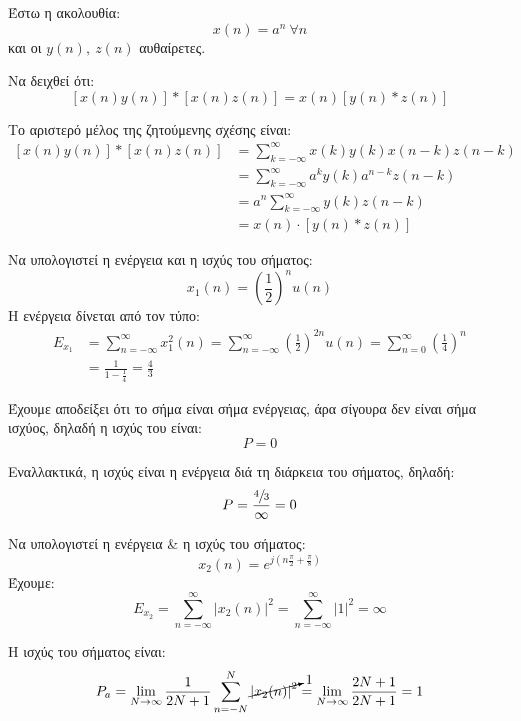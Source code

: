 \documentclass[11pt,a4paper,notitlepage,fleqn]{article}
\begin{document}
\begin{exercise}
	Έστω η ακολουθία:
	\[
	x(n) = a^n\ \forall n
	\]
	και οι \( y(n), \ z(n) \) αυθαίρετες.
	
	Να δειχθεί ότι:
	\[
	\left[
	x(n)y(n)
	\right]*\left[
	x(n)z(n)
	\right] = x(n)\left[
	y(n)*z(n)
	\right]
	\]
	
	\tcblower
	
	Το αριστερό μέλος της ζητούμενης σχέσης είναι:
	\begin{align*}
		\left[
		x(n)y(n)
		\right]*\left[
		x(n)z(n)
		\right] &=
		\sum_{k=-\infty}^{\infty}
		x(k)y(k)x(n-k)z(n-k)
		\\ &= \sum_{k=-\infty}^{\infty} a^k y(k)a^{n-k} z(n-k)
		\\ &= a^n \sum_{k=-\infty}^{\infty} y(k) z(n-k)
		\\ &= x(n) \cdot \left[y(n) * z(n)\right]
	\end{align*}
\end{exercise}

\begin{exercise}
	Να υπολογιστεί η ενέργεια και η ισχύς του σήματος:
	\[
	x_1(n) = \left( \frac{1}{2} \right)^n u(n)
	\]
	\tcblower
	Η ενέργεια δίνεται από τον τύπο:
	\begin{align*}
		E_{x_1} &=
		\sum_{n=-\infty}^{\infty}x_1^2(n) = \sum_{n=-\infty}^{\infty}\left(\frac{1}{2}\right)^{2n}
		u(n) = \sum_{n=0}^{\infty}\left( \frac{1}{4} \right)^n
		\\ &= \frac{1}{1-\frac{1}{4}} = \frac{4}{3}
	\end{align*}
	
	Έχουμε αποδείξει ότι το σήμα είναι σήμα ενέργειας, άρα σίγουρα δεν είναι σήμα ισχύος, δηλαδή η ισχύς του είναι:
	\[
	P=0
	\]
	
	Εναλλακτικά, η ισχύς είναι η ενέργεια διά τη διάρκεια του σήματος, δηλαδή:
	\[
	P = \frac{\sfrac{4}{3} }{\infty} = 0
	\]
\end{exercise}

\begin{exercise}
	Να υπολογιστεί η ενέργεια \& η ισχύς του σήματος:
	\[
	x_2(n) = e^{j\left( n\frac{π}{2} + \frac{π}{8} \right)}
	\]
	\tcblower
	Έχουμε:
	\[
	E_{x_2} = \sum_{n=-\infty}^{\infty} \left|x_2(n)\right|^2 = \sum_{n=-\infty}^{\infty} |1|^2 = \infty
	\]
	
	Η ισχύς του σήματος είναι:
	\[
	P_a = \lim_{N\to \infty}\frac{1}{2N+1}
	\sum_{n=-N}^{N} \cancelto{1}{\left|x_2(n)\right|^2}
	= \lim_{N\to \infty}\frac{2N+1}{2N+1} = 1
	\]
\end{exercise}
\end{document}
